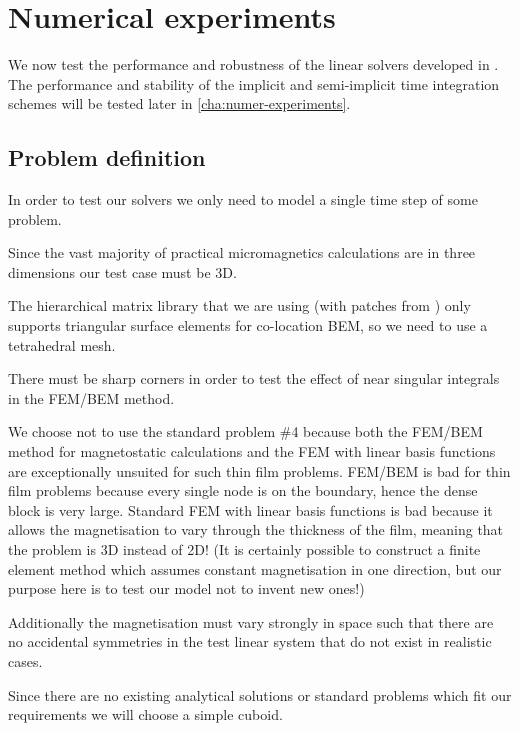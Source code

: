 

\section{Numerical experiments}

We now test the performance and robustness of the linear solvers developed in .
The performance and stability of the implicit and semi-implicit time integration schemes will be tested later in \cref{cha:numer-experiments}.


\subsection{Problem definition}

In order to test our solvers we only need to model a single time step of some problem.

Since the vast majority of practical micromagnetics calculations are in three dimensions our test case must be 3D.

The hierarchical matrix library that we are using (\hlib with patches from \nmag) only supports triangular surface elements for co-location BEM, so we need to use a tetrahedral mesh.

There must be sharp corners in order to test the effect of near singular integrals in the FEM/BEM method.

We choose not to use the \mumag standard problem \#4 because both the FEM/BEM method for magnetostatic calculations and the FEM with linear basis functions are exceptionally unsuited for such thin film problems.
FEM/BEM is bad for thin film problems because every single node is on the boundary, hence the dense block is very large.
Standard FEM with linear basis functions is bad because it allows the magnetisation to vary through the thickness of the film, meaning that the problem is 3D instead of 2D!
(It is certainly possible to construct a finite element method which assumes constant magnetisation in one direction, but our purpose here is to test our model not to invent new ones!)

Additionally the magnetisation must vary strongly in space such that there are no accidental symmetries in the test linear system that do not exist in realistic cases.  

Since there are no existing analytical solutions or standard problems which fit our requirements we will choose a simple cuboid.

